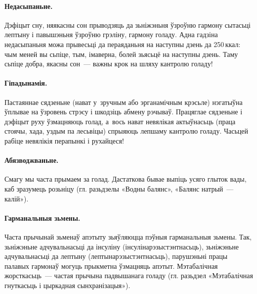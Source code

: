 \paragraph{Недасыпаньне.}
Дэфіцыт сну, няякасны сон прыводзяць да зьніжэньня ўзроўню гармону сытасьці лептыну і павышэньня ўзроўню грэліну, гармону голаду. Адна гадзіна недасыпаньня можа прывесьці да пераяданьня на наступны дзень да 250\,ккал: чым меней вы сьпіце, тым, імаверна, болей зьясьцё на наступны дзень. Таму сьпіце добра, якасны сон~--- важны крок на шляху кантролю голаду!

\paragraph{Гіпадынамія.}
Пастаяннае сядзеньне (нават у~зручным або эрганамічным крэсьле) нэгатыўна ўплывае на ўзровень стрэсу і шкодзіць абмену рэчываў. Працяглае сядзеньне і дэфіцыт руху ўзмацняюць голад, а~вось нават невялікая актыўнасьць (праца стоячы, хада, уздым па лесьвіцы) спрыяюць лепшаму кантролю голаду. Часьцей рабіце невялікія перапынкі і рухайцеся!


\paragraph{Абязводжваньне.}
Смагу мы часта прымаем за голад. Дастаткова бывае выпіць усяго глыток вады, каб зразумець розьніцу (гл. разьдзелы «Водны балянс», «Балянс натрый~--- калій»).

\paragraph{Гарманальныя зьмены.}
Часта прычынай зьменаў апэтыту зьяўляюцца пэўныя гарманальныя зьмены. Так, зьніжэньне адчувальнасьці да інсуліну (інсулінарэзыстэнтнасьць), зьніжэньне адчувальнасьці да лептыну (лептынарэзыстэнтнасьць), парушэньні працы палавых гармонаў могуць прыкметна ўзмацняць апэтыт. Мэтабалічная жорсткасьць~--- частая прычына падвышанага голаду (гл. разьдзел «Мэтабалічная гнуткасьць і цыркадная сынхранізацыя»).

